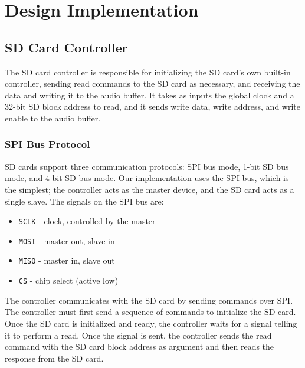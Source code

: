 \documentclass{article}
\begin{document}
\section{Design Implementation}

\subsection{SD Card Controller}

The SD card controller is responsible for initializing the SD card's own
built-in controller, sending read commands to the SD card as necessary, and
receiving the data and writing it to the audio buffer.  It takes as inputs the
global clock and a 32-bit SD block address to read, and it sends write data,
write address, and write enable to the audio buffer.

\subsubsection{SPI Bus Protocol}

SD cards support three communication protocols: SPI bus mode, 1-bit SD bus
mode, and 4-bit SD bus mode. Our implementation uses the SPI bus, which is the
simplest; the controller acts as the master device, and the SD card acts as a
single slave.  The signals on the SPI bus are:

\begin{itemize}
	\item \texttt{SCLK} - clock, controlled by the master
	\item \texttt{MOSI} - master out, slave in
	\item \texttt{MISO} - master in, slave out
	\item \texttt{CS} - chip select (active low)
\end{itemize}

The controller communicates with the SD card by sending commands over SPI.
The controller must first send a sequence of commands to initialize the SD card.
Once the SD card is initialized and ready, the controller waits for a signal
telling it to perform a read. Once the signal is sent, the controller sends
the read command with the SD card block address as argument and then reads
the response from the SD card.
\end{document}
